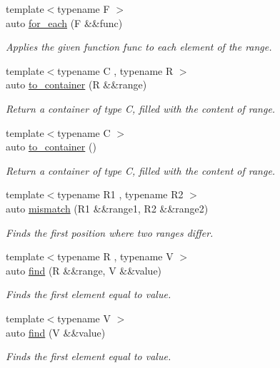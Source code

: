 \begin{DoxyCompactItemize}
{\footnotesize template$<$typename F $>$ }\\auto \mbox{\hyperlink{namespacerah_a76e2ce1a497aa3726cc9d99fb320ac67}{for\+\_\+each}} (F \&\&func)
\begin{DoxyCompactList}\small\item\em Applies the given function func to each element of the range. \end{DoxyCompactList}\item 
{\footnotesize template$<$typename C , typename R $>$ }\\auto \mbox{\hyperlink{namespacerah_a11fcae12055a2bcf5ac7c41e25e74a32}{to\+\_\+container}} (R \&\&range)
\begin{DoxyCompactList}\small\item\em Return a container of type C, filled with the content of range. \end{DoxyCompactList}\item 
{\footnotesize template$<$typename C $>$ }\\auto \mbox{\hyperlink{namespacerah_aac33763a1f49060e179c2c2053ec07a2}{to\+\_\+container}} ()
\begin{DoxyCompactList}\small\item\em Return a container of type C, filled with the content of range. \end{DoxyCompactList}\item 
{\footnotesize template$<$typename R1 , typename R2 $>$ }\\auto \mbox{\hyperlink{namespacerah_a5ce2d92c6f0b3dd5eb6d70600e949a97}{mismatch}} (R1 \&\&range1, R2 \&\&range2)
\begin{DoxyCompactList}\small\item\em Finds the first position where two ranges differ. \end{DoxyCompactList}\item 
{\footnotesize template$<$typename R , typename V $>$ }\\auto \mbox{\hyperlink{namespacerah_a7c7d4f08068e85923f475a069c3daeb7}{find}} (R \&\&range, V \&\&value)
\begin{DoxyCompactList}\small\item\em Finds the first element equal to value. \end{DoxyCompactList}\item 
{\footnotesize template$<$typename V $>$ }\\auto \mbox{\hyperlink{namespacerah_a37f60e134164914703fdd0508f83ee11}{find}} (V \&\&value)
\begin{DoxyCompactList}\small\item\em Finds the first element equal to value. \end{DoxyCompactList}\item 

\end{DoxyCompactItemize}
